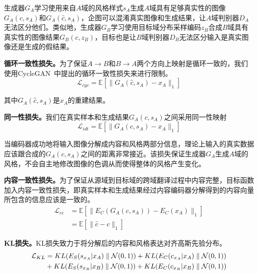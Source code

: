 生成器$G_A$学习使用来自$A$域的风格样式$s_A$生成$A$域具有足够真实性的图像$G_A(c,s_A)$和$G_A(\hat{c},s_A)$，企图可以混淆真实图像和生成结果，让$A$域判别器$D_A$无法区分他们。类似地，生成器$G_B$学习使用目标域分布采样编码$z_B$合成$B$域具有真实性的图像结果$G_B(c,z_B)$，目标也是让$B$域判别器$D_B$无法区分输入是真实图像还是生成的假结果。

\textbf{循环一致性损失。}为了保证$A \rightarrow B$和$B \rightarrow A$两个方向上映射是循环一致的，我们使用CycleGAN~\cite{zhu2017unpaired}中提出的循环一致性损失来进行限制。
\begin{equation}
\label{equ:cycle}
\mathcal{L}_{cyc} = \mathbb{E}[\| G_A(\hat{c}, s_A) - x_A \|_1]
\end{equation}

其中$G_A(\hat{c}, s_A)$是$x_A$的重建结果。

\textbf{同一性损失。}我们在真实样本和生成结果$G_A(c,s_A)$之间采用同一性映射
\begin{equation}
\label{equ:idt}
\mathcal{L}_{idt} = \mathbb{E}[\| G_A(c, s_A) - x_A \|_1]
\end{equation}

当编码器成功地将输入图像分解成内容和风格两部分信息，理论上输入的真实数据应该跟合成的$G_A(c,s_A)$之间的距离非常接近。该损失保证生成器$G_A$生成$A$域的风格，不会自主地修改图像的色调从而使得整体的风格产生变化。

\textbf{内容一致性损失。}为了保证从源域到目标域的跨域翻译过程中内容完整，目标函数加入内容一致性损失，即真实样本和生成结果经过内容编码器分解得到的内容向量所包含的信息应该是一致的。
\begin{equation}
\label{equ:cc}
\begin{aligned}
\mathcal{L}_{cc} & = \mathbb{E}[\| E_C(G_A(c, s_A)) - E_C(x_A) \|_1] \\
       & = \mathbb{E}[\| \hat{c} - c \|_1]
\end{aligned}
\end{equation}

\textbf{KL损失。}KL损失致力于将分解后的内容和风格表达对齐高斯先验分布。
\begin{equation}
\begin{split}
\mathcal{L}_{KL}& = \mathnormal{KL}(E_S(s_{x_A}|x_A)\parallel \mathcal{N}(0,1)) + \mathnormal{KL}(E_C(c_{x_A}|x_A)\parallel \mathcal{N}(0,1)) \\
 & + \mathnormal{KL}(E_S(s_{x_B}|x_B)\parallel \mathcal{N}(0,1)) + \mathnormal{KL}(E_C(c_{x_B}|x_B)\parallel \mathcal{N}(0,1))
\end{split}
\label{eq:KL}
\end{equation}

